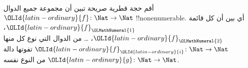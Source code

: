 \documentclass[../../../include/open-logic-section]{subfiles}
\begin{document}
\begin{prob}
أقم حجة قطرية صريحة تبين أن مجموعة جميع الدوال $\OLId{latin-ordinary}{f} \colon \Nat \to
\Nat$ !!{nonenumerable}. أي بين أن كل قائمة $\OLId{latin-ordinary}{f}_\OLMathNumeral{1}$، $\OLId{latin-ordinary}{f}_\OLMathNumeral{2}$، \dots{} من الدوال التي نوع كل منها $\OLId{latin-ordinary}{f}_\OLId{latin-ordinary}{i}\colon \Nat \to \Nat$ تفوتها دالة $\OLId{latin-ordinary}{g} \colon \Nat \to \Nat$ من النوع نفسه.
\end{prob}
\end{document}

